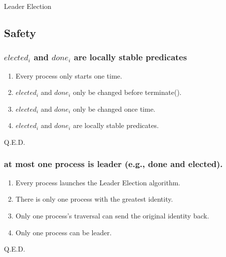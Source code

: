 \documentclass{article}
\begin{document}
\begin{algorithm}[H]


  \fNewLine


  \caption{Leader Election}
\end{algorithm}

\subsection{Safety}
\subsubsection{$elected_i$ and $done_i$ are locally stable predicates}
\begin{enumerate}
  \item Every process only starts one time.
  \item $elected_i$ and $done_i$ only be changed before terminate().
  \item $elected_i$ and $done_i$ only be changed once time.
  \item $elected_i$ and $done_i$ are locally stable predicates.
\end{enumerate}
Q.E.D.

\subsubsection{at most one process is leader (e.g., done and elected).}
\begin{enumerate}
  \item Every process launches the Leader Election algorithm.
  \item There is only one process with the greatest identity.
  \item Only one process's traversal can send the original identity back.
  \item Only one process can be leader.
\end{enumerate}
Q.E.D.
\end{document}
